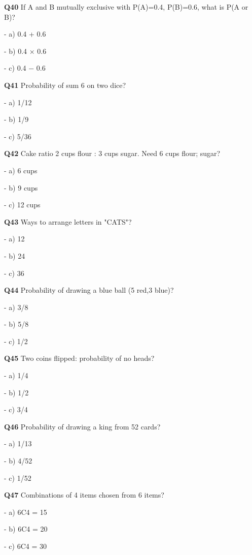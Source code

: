 \textbf{Q40} If A and B mutually exclusive with P(A)=0.4, P(B)=0.6, what is P(A or B)?\par
\quad - a) 0.4 + 0.6\par
\quad - b) 0.4 × 0.6\par
\quad - c) 0.4 − 0.6\par

\textbf{Q41} Probability of sum 6 on two dice?\par
\quad - a) 1/12\par
\quad - b) 1/9\par
\quad - c) 5/36\par

\textbf{Q42} Cake ratio 2 cups flour : 3 cups sugar. Need 6 cups flour; sugar?\par
\quad - a) 6 cups\par
\quad - b) 9 cups\par
\quad - c) 12 cups\par

\textbf{Q43} Ways to arrange letters in "CATS"?\par
\quad - a) 12\par
\quad - b) 24\par
\quad - c) 36\par

\textbf{Q44} Probability of drawing a blue ball (5 red,3 blue)?\par
\quad - a) 3/8\par
\quad - b) 5/8\par
\quad - c) 1/2\par

\textbf{Q45} Two coins flipped: probability of no heads?\par
\quad - a) 1/4\par
\quad - b) 1/2\par
\quad - c) 3/4\par

\textbf{Q46} Probability of drawing a king from 52 cards?\par
\quad - a) 1/13\par
\quad - b) 4/52\par
\quad - c) 1/52\par

\textbf{Q47} Combinations of 4 items chosen from 6 items?\par
\quad - a) 6C4 = 15\par
\quad - b) 6C4 = 20\par
\quad - c) 6C4 = 30\par


